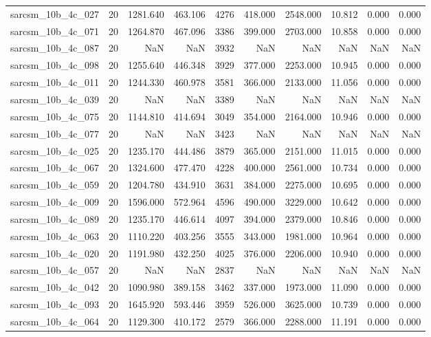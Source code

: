 \begin{tabular}{lrrrrrrrrr}
sarcsm\_10b\_4c\_027 & 20 & 1281.640 & 463.106 & 4276 & 418.000 & 2548.000 & 10.812 & 0.000 & 0.000 \\
sarcsm\_10b\_4c\_071 & 20 & 1264.870 & 467.096 & 3386 & 399.000 & 2703.000 & 10.858 & 0.000 & 0.000 \\
sarcsm\_10b\_4c\_087 & 20 & NaN & NaN & 3932 & NaN & NaN & NaN & NaN & NaN \\
sarcsm\_10b\_4c\_098 & 20 & 1255.640 & 446.348 & 3929 & 377.000 & 2253.000 & 10.945 & 0.000 & 0.000 \\
sarcsm\_10b\_4c\_011 & 20 & 1244.330 & 460.978 & 3581 & 366.000 & 2133.000 & 11.056 & 0.000 & 0.000 \\
sarcsm\_10b\_4c\_039 & 20 & NaN & NaN & 3389 & NaN & NaN & NaN & NaN & NaN \\
sarcsm\_10b\_4c\_075 & 20 & 1144.810 & 414.694 & 3049 & 354.000 & 2164.000 & 10.946 & 0.000 & 0.000 \\
sarcsm\_10b\_4c\_077 & 20 & NaN & NaN & 3423 & NaN & NaN & NaN & NaN & NaN \\
sarcsm\_10b\_4c\_025 & 20 & 1235.170 & 444.486 & 3879 & 365.000 & 2151.000 & 11.015 & 0.000 & 0.000 \\
sarcsm\_10b\_4c\_067 & 20 & 1324.600 & 477.470 & 4228 & 400.000 & 2561.000 & 10.734 & 0.000 & 0.000 \\
sarcsm\_10b\_4c\_059 & 20 & 1204.780 & 434.910 & 3631 & 384.000 & 2275.000 & 10.695 & 0.000 & 0.000 \\
sarcsm\_10b\_4c\_009 & 20 & 1596.000 & 572.964 & 4596 & 490.000 & 3229.000 & 10.642 & 0.000 & 0.000 \\
sarcsm\_10b\_4c\_089 & 20 & 1235.170 & 446.614 & 4097 & 394.000 & 2379.000 & 10.846 & 0.000 & 0.000 \\
sarcsm\_10b\_4c\_063 & 20 & 1110.220 & 403.256 & 3555 & 343.000 & 1981.000 & 10.964 & 0.000 & 0.000 \\
sarcsm\_10b\_4c\_020 & 20 & 1191.980 & 432.250 & 4025 & 376.000 & 2206.000 & 10.940 & 0.000 & 0.000 \\
sarcsm\_10b\_4c\_057 & 20 & NaN & NaN & 2837 & NaN & NaN & NaN & NaN & NaN \\
sarcsm\_10b\_4c\_042 & 20 & 1090.980 & 389.158 & 3462 & 337.000 & 1973.000 & 11.090 & 0.000 & 0.000 \\
sarcsm\_10b\_4c\_093 & 20 & 1645.920 & 593.446 & 3959 & 526.000 & 3625.000 & 10.739 & 0.000 & 0.000 \\
sarcsm\_10b\_4c\_064 & 20 & 1129.300 & 410.172 & 2579 & 366.000 & 2288.000 & 11.191 & 0.000 & 0.000 \\

\end{tabular}
